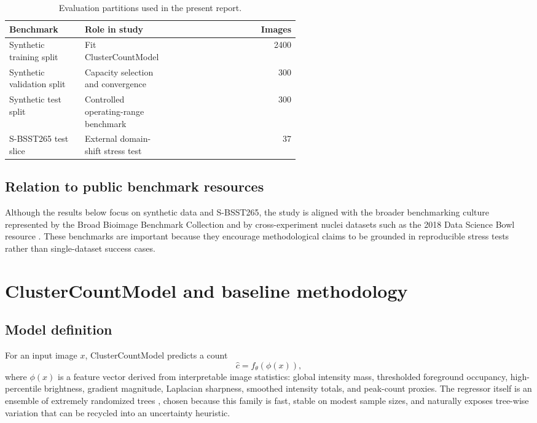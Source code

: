 \documentclass[10pt,a4paper,twocolumn]{article}
\begin{document}
\begin{table}[H]
\centering
\footnotesize
\begin{tabular}{L{0.26\linewidth} L{0.29\linewidth} r}
\toprule
\textbf{Benchmark} & \textbf{Role in study} & \textbf{Images} \\
\midrule
Synthetic training split & Fit ClusterCountModel & 2400 \\
Synthetic validation split & Capacity selection and convergence & 300 \\
Synthetic test split & Controlled operating-range benchmark & 300 \\
S-BSST265 test slice & External domain-shift stress test & 37 \\
\bottomrule
\end{tabular}
\caption{Evaluation partitions used in the present report.}
\label{tab:splits}
\end{table}

\subsection{Relation to public benchmark resources}
Although the results below focus on synthetic data and S-BSST265, the study is aligned with the broader benchmarking culture represented by the Broad Bioimage Benchmark Collection and by cross-experiment nuclei datasets such as the 2018 Data Science Bowl resource \cite{ljosa,bbbc004,bbbc005,dsb2018}. These benchmarks are important because they encourage methodological claims to be grounded in reproducible stress tests rather than single-dataset success cases.

\section{ClusterCountModel and baseline methodology}

\subsection{Model definition}
For an input image $x$, ClusterCountModel predicts a count
\begin{equation}
\hat{c}=f_{\theta}(\phi(x)),
\end{equation}
where $\phi(x)$ is a feature vector derived from interpretable image statistics: global intensity mass, thresholded foreground occupancy, high-percentile brightness, gradient magnitude, Laplacian sharpness, smoothed intensity totals, and peak-count proxies. The regressor itself is an ensemble of extremely randomized trees \cite{extratrees}, chosen because this family is fast, stable on modest sample sizes, and naturally exposes tree-wise variation that can be recycled into an uncertainty heuristic.
\end{document}
